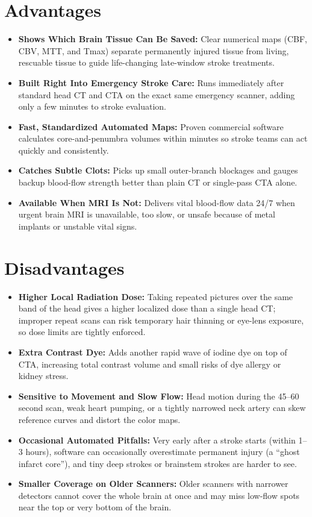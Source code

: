 \section{Advantages}
\begin{itemize}
    \item \textbf{Shows Which Brain Tissue Can Be Saved:} Clear numerical maps (CBF, CBV, MTT, and Tmax) separate permanently injured tissue from living, rescuable tissue to guide life-changing late-window stroke treatments.
    \item \textbf{Built Right Into Emergency Stroke Care:} Runs immediately after standard head CT and CTA on the exact same emergency scanner, adding only a few minutes to stroke evaluation.
    \item \textbf{Fast, Standardized Automated Maps:} Proven commercial software calculates core-and-penumbra volumes within minutes so stroke teams can act quickly and consistently.
    \item \textbf{Catches Subtle Clots:} Picks up small outer-branch blockages and gauges backup blood-flow strength better than plain CT or single-pass CTA alone.
    \item \textbf{Available When MRI Is Not:} Delivers vital blood-flow data 24/7 when urgent brain MRI is unavailable, too slow, or unsafe because of metal implants or unstable vital signs.
\end{itemize}

\section{Disadvantages}
\begin{itemize}
    \item \textbf{Higher Local Radiation Dose:} Taking repeated pictures over the same band of the head gives a higher localized dose than a single head CT; improper repeat scans can risk temporary hair thinning or eye-lens exposure, so dose limits are tightly enforced.
    \item \textbf{Extra Contrast Dye:} Adds another rapid wave of iodine dye on top of CTA, increasing total contrast volume and small risks of dye allergy or kidney stress.
    \item \textbf{Sensitive to Movement and Slow Flow:} Head motion during the 45--60 second scan, weak heart pumping, or a tightly narrowed neck artery can skew reference curves and distort the color maps.
    \item \textbf{Occasional Automated Pitfalls:} Very early after a stroke starts (within 1--3 hours), software can occasionally overestimate permanent injury (a ``ghost infarct core''), and tiny deep strokes or brainstem strokes are harder to see.
    \item \textbf{Smaller Coverage on Older Scanners:} Older scanners with narrower detectors cannot cover the whole brain at once and may miss low-flow spots near the top or very bottom of the brain.
\end{itemize}

